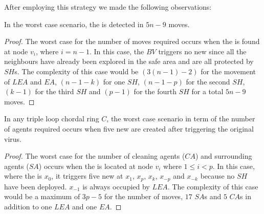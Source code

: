 \noindent After employing this strategy we made the following observations: 
\begin{theorem}
In the worst case scenario, the \bv is detected in $5n-9$ moves.
 
\end{theorem}
\begin{proof}
The worst case for the number of moves required occurs when the \bv  is found at node $v_i$, where $i=n-1$. 
  In this case, the $BV$ triggers no new \bvs since all the neighbours have already been explored in the safe area and are all protected by $SH$s.
% 
 The complexity of this case would be $(3(n-1)-2)$ for the movement of $LEA$ and $EA$, $(n-1-k)$ for one $SH$, $(n-1-p)$ for the second $SH$, $(k-1)$ for the third $SH$ and $(p-1)$ for the fourth $SH$ for a total $5n-9$ moves.
\end{proof}
\begin{theorem}
In any triple loop chordal ring $C$, the worst case scenario in term of the number of agents required occurs when five new \bvs are created after triggering the original virus.
\end{theorem}

\begin{proof}
The worst case for the number of cleaning agents ($CA$) and surrounding agents ($SA$) occurs when the \bv is located at node $v_i$ where $1 \leq i < p$. In this case, where the \bv is $x_0$, it  triggers five new \bvs at $x_1$, $x_p$, $x_k$, $x_{-p}$ and $x_{-k}$ because no $SH$ have been deployed. $x_{-1} $ is always occupied by $LEA$. The complexity of this case would be a maximum of $3p-5$ for the number of moves, $17$ $SA$s and $5$ $CA$s in addition to one $LEA$ and  one $EA$.
\end{proof}



